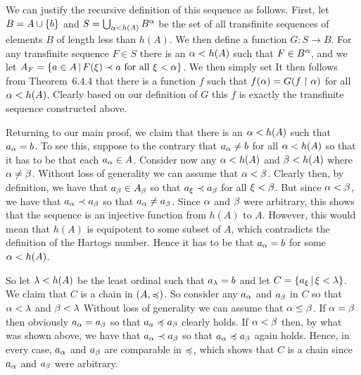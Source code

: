 \begin{questions}
{{    We can justify the recursive definition of this sequence as follows.
    First, let $B = A \cup \left\{ b \right\}$ and $S = \bigcup_{\alpha < h(A)} B^\alpha$ be the set of all transfinite sequences of elements $B$ of length less than $h(A)$.
    We then define a function $G: S \to B$.
    For any transfinite sequence $F \in S$ there is an $\alpha < h(A)$ such that $F \in B^\alpha$, and we let $A_F = \left\{ a \in A \,|\, F(\xi) \prec a \text{ for all } \xi < \alpha \right\}$.
    We then simply set
    It then follows from Theorem~6.4.4 that there is a function $f$ such that $f(\alpha) = G(f \restriction \alpha)$ for all $\alpha < h(A)$.
    Clearly based on our definition of $G$ this $f$ is exactly the transfinite sequence constructed above.

    Returning to our main proof, we claim that there is an $\alpha < h(A)$ such that $a_\alpha = b$.
    To see this, suppose to the contrary that $a_\alpha \neq b$ for all $\alpha < h(A)$ so that it has to be that each $a_\alpha \in A$.
    Consider now any $\alpha < h(A)$ and $\beta < h(A)$ where $\alpha \neq \beta$.
    Without loss of generality we can assume that $\alpha < \beta$.
    Clearly then, by definition, we have that $a_\beta \in A_\beta$ so that $a_\xi \prec a_\beta$ for all $\xi < \beta$.
    But since $\alpha < \beta$, we have that $a_\alpha \prec a_\beta$ so that $a_\alpha \neq a_\beta$.
    Since $\alpha$ and $\beta$ were arbitrary, this shows that the sequence is an injective function from $h(A)$ to $A$.
    However, this would mean that $h(A)$ is equipotent to some subset of $A$, which contradicts the definition of the Hartogs number.
    Hence it has to be that $a_\alpha = b$ for some $\alpha < h(A)$.

    So let $\lambda < h(A)$ be the least ordinal such that $a_\lambda = b$ and let $C = \left\{ a_\xi \,|\, \xi < \lambda \right\}$.
    We claim that $C$ is a chain in $(A, \preccurlyeq)$.
    So consider any $a_\alpha$ and $a_\beta$ in $C$ so that $\alpha < \lambda$ and $\beta < \lambda$
    Without loss of generality we can assume that $\alpha \leq \beta$.
    If $\alpha = \beta$ then obviously $a_\alpha = a_\beta$ so that $a_a \preccurlyeq a_\beta$ clearly holds.
    If $\alpha < \beta$ then, by what was shown above, we have that $a_\alpha \prec a_\beta$ so that $a_\alpha \preccurlyeq a_\beta$ again holds.
    Hence, in every case, $a_\alpha$ and $a_\beta$ are comparable in $\preccurlyeq$, which shows that $C$ is a chain since $a_\alpha$ and $a_\beta$ were arbitrary.

}}
\end{questions}
